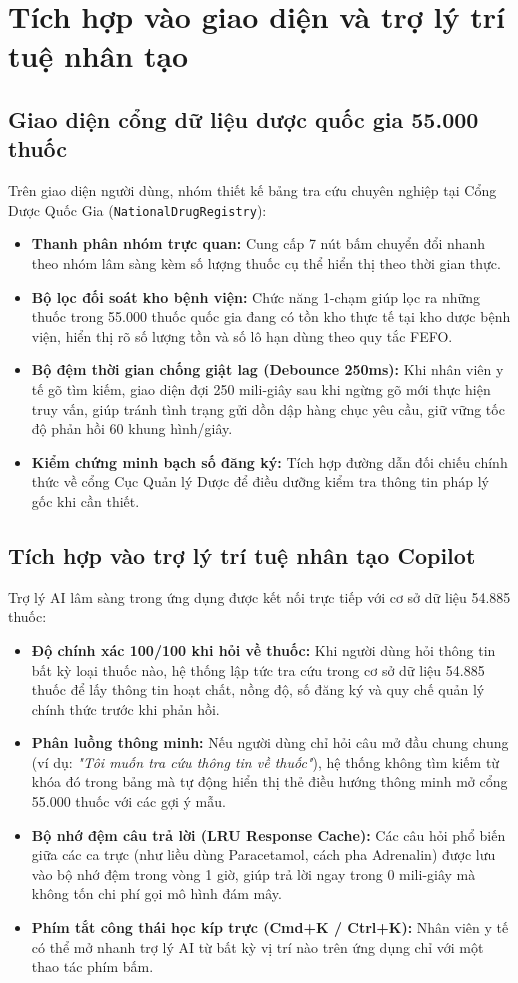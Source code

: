 \documentclass[12pt,a4paper]{article}
\begin{document}
\section{Tích hợp vào giao diện và trợ lý trí tuệ nhân tạo}

\subsection{Giao diện cổng dữ liệu dược quốc gia 55.000 thuốc}
Trên giao diện người dùng, nhóm thiết kế bảng tra cứu chuyên nghiệp tại Cổng Dược Quốc Gia (\texttt{NationalDrugRegistry}):
\begin{itemize}[leftmargin=1.5em]
    \item \textbf{Thanh phân nhóm trực quan:} Cung cấp 7 nút bấm chuyển đổi nhanh theo nhóm lâm sàng kèm số lượng thuốc cụ thể hiển thị theo thời gian thực.
    \item \textbf{Bộ lọc đối soát kho bệnh viện:} Chức năng 1-chạm giúp lọc ra những thuốc trong 55.000 thuốc quốc gia đang có tồn kho thực tế tại kho dược bệnh viện, hiển thị rõ số lượng tồn và số lô hạn dùng theo quy tắc FEFO.
    \item \textbf{Bộ đệm thời gian chống giật lag (Debounce 250ms):} Khi nhân viên y tế gõ tìm kiếm, giao diện đợi 250 mili-giây sau khi ngừng gõ mới thực hiện truy vấn, giúp tránh tình trạng gửi dồn dập hàng chục yêu cầu, giữ vững tốc độ phản hồi 60 khung hình/giây.
    \item \textbf{Kiểm chứng minh bạch số đăng ký:} Tích hợp đường dẫn đối chiếu chính thức về cổng Cục Quản lý Dược để điều dưỡng kiểm tra thông tin pháp lý gốc khi cần thiết.
\end{itemize}

\subsection{Tích hợp vào trợ lý trí tuệ nhân tạo Copilot}
Trợ lý AI lâm sàng trong ứng dụng được kết nối trực tiếp với cơ sở dữ liệu 54.885 thuốc:
\begin{itemize}[leftmargin=1.5em]
    \item \textbf{Độ chính xác 100/100 khi hỏi về thuốc:} Khi người dùng hỏi thông tin bất kỳ loại thuốc nào, hệ thống lập tức tra cứu trong cơ sở dữ liệu 54.885 thuốc để lấy thông tin hoạt chất, nồng độ, số đăng ký và quy chế quản lý chính thức trước khi phản hồi.
    \item \textbf{Phân luồng thông minh:} Nếu người dùng chỉ hỏi câu mở đầu chung chung (ví dụ: \textit{"Tôi muốn tra cứu thông tin về thuốc"}), hệ thống không tìm kiếm từ khóa đó trong bảng mà tự động hiển thị thẻ điều hướng thông minh mở cổng 55.000 thuốc với các gợi ý mẫu.
    \item \textbf{Bộ nhớ đệm câu trả lời (LRU Response Cache):} Các câu hỏi phổ biến giữa các ca trực (như liều dùng Paracetamol, cách pha Adrenalin) được lưu vào bộ nhớ đệm trong vòng 1 giờ, giúp trả lời ngay trong 0 mili-giây mà không tốn chi phí gọi mô hình đám mây.
    \item \textbf{Phím tắt công thái học kíp trực (Cmd+K / Ctrl+K):} Nhân viên y tế có thể mở nhanh trợ lý AI từ bất kỳ vị trí nào trên ứng dụng chỉ với một thao tác phím bấm.
\end{itemize}
\end{document}

